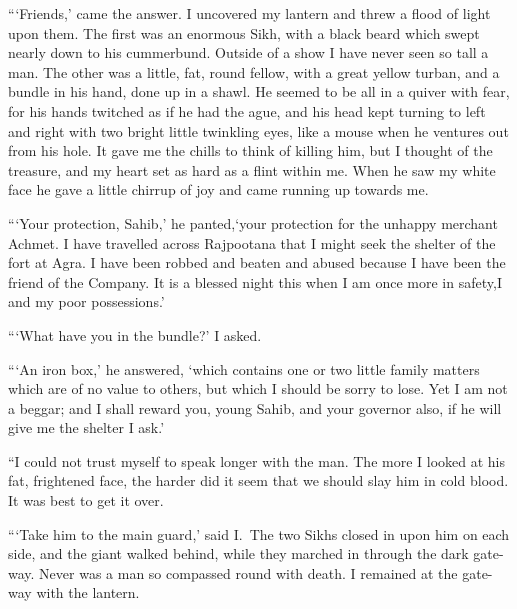 \documentclass[12pt,english,oneside]{book}
\begin{document}
{}```Friends,' came the answer. I uncovered my lantern and threw
a flood of light upon them. The first was an enormous Sikh, with a
black beard which swept nearly down to his cummerbund. Outside of
a show I have never seen so tall a man. The other was a little, fat,
round fellow, with a great yellow turban, and a bundle in his hand,
done up in a shawl. He seemed to be all in a quiver with fear, for
his hands twitched as if he had the ague, and his head kept turning
to left and right with two bright little twinkling eyes, like a mouse
when he ventures out from his hole. It gave me the chills to think
of killing him, but I thought of the treasure, and my heart set as
hard as a flint within me. When he saw my white face he gave a little
chirrup of joy and came running up towards me.

{}```Your protection, Sahib,' he pant\-ed,\mdsh{---}`your protection
for the unhappy merchant Achmet. I have travelled across Rajpootana
that I might seek the shelter of the fort at Agra. I have been robbed
and beaten and abused because I have been the friend of the Company.
It is a blessed night this when I am once more in safety,\mdsh{---}I
and my poor possessions.'

{}```What have you in the bundle?' I asked.

{}```An iron box,' he answered, `which contains one or two little
family matters which are of no value to others, but which I should
be sorry to lose. Yet I am not a beggar; and I shall reward you, young
Sahib, and your governor also, if he will give me the shelter I ask.'

{}``I could not trust myself to speak longer with the man. The more
I looked at his fat, frightened face, the harder did it seem that
we should slay him in cold blood. It was best to get it over.

{}```Take him to the main guard,' said I.\  The two Sikhs closed
in upon him on each side, and the giant walked behind, while they
marched in through the dark gate-way. Never was a man so compassed
round with death. I remained at the gate-way with the lantern.
\end{document}
